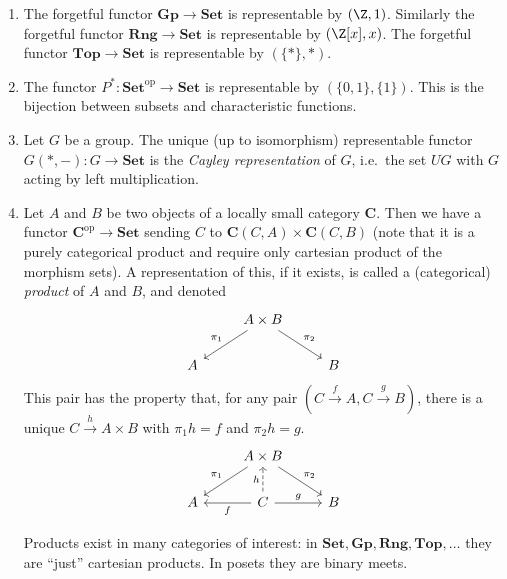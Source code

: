 \documentclass[a4paper]{article}
\renewcommand{\c}[1]{\mathbf{#1}}
\newcommand{\Set}{{\c{Set}}}
\newcommand{\Top}{{\c{Top}}}
\begin{document}
\begin{eg}\leavevmode
  \label{eg:representable functor}
  \begin{enumerate}
  \item The forgetful functor \(\c{Gp} \to \Set\) is representable by \((\Z, 1)\). Similarly the forgetful functor \(\c{Rng} \to \Set\) is representable by \((\Z[x], x)\). The forgetful functor \(\Top \to \Set\) is representable by \((\{*\}, *)\).
  \item The functor \(P^*: \Set^{\text{op}} \to \Set\) is representable by \((\{0, 1\}, \{1\})\). This is the bijection between subsets and characteristic functions.
  \item Let \(G\) be a group. The unique (up to isomorphism) representable functor \(G(*, -): G \to \Set\) is the \emph{Cayley representation} of \(G\), i.e.\ the set \(UG\) with \(G\) acting by left multiplication.
  \item Let \(A\) and \(B\) be two objects of a locally small category \(\c C\). Then we have a functor \(\c C^{\text{op}} \to \Set\) sending \(C\) to \(\c C(C, A) \times \c C(C, B)\) (note that it is a purely categorical product and require only cartesian product of the morphism sets). A representation of this, if it exists, is called a (categorical) \emph{product} of \(A\) and \(B\), and denoted
    \[
      \begin{tikzcd}
        & A \times B \ar[dl, "\pi_1"'] \ar[dr, "\pi_2"] \\
        A & & B
      \end{tikzcd}
    \]
    This pair has the property that, for any pair \((C \xrightarrow{f} A, C \xrightarrow{g} B)\), there is a unique \(C \xrightarrow{h} A \times B\) with \(\pi_1 h = f\) and \(\pi_2 h = g\).
    \[
      \begin{tikzcd}
        & A \times B \ar[dl, "\pi_1"'] \ar[dr, "\pi_2"] \\
        A & C \ar[l, "f"] \ar[r, "g"] \ar[u, "h", dashed] & B
      \end{tikzcd}
    \]

    Products exist in many categories of interest: in \(\Set, \c{Gp}, \c{Rng}, \Top, \dots\) they are ``just'' cartesian products. In posets they are binary meets.


\end{enumerate}
\end{eg}
\end{document}
